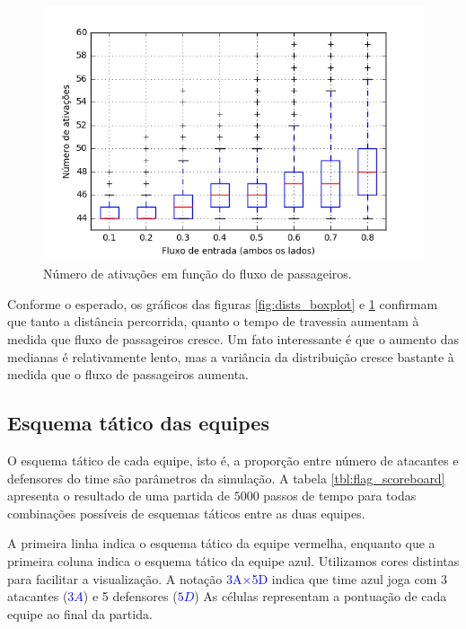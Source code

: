 \documentclass[preprint,12pt]{elsarticle}
\newcommand{\blu}[1]{\textcolor{blue}{#1}}
\begin{document}
\begin{figure}[H]
	\centering
	\includegraphics[totalheight=7cm]{figures/ativs_boxplot.png}
	\caption{Número de ativações em função do fluxo de passageiros.}
	\label{fig:atvs_boxplot}
\end{figure}

Conforme o esperado, os gráficos das figuras \ref{fig:dists_boxplot} e \ref{fig:atvs_boxplot} confirmam que tanto a distância percorrida, quanto o tempo de travessia aumentam à medida que fluxo de passageiros cresce. Um fato interessante é que o aumento das medianas é relativamente lento, mas a variância da distribuição cresce bastante à medida que o fluxo de passageiros aumenta.

\subsection{Esquema tático das equipes}
\label{subsec:esquema_tatico}

O esquema tático de cada equipe, isto é, a proporção entre número de atacantes e defensores do time são parâmetros da simulação. A tabela \ref{tbl:flag_scoreboard} apresenta o resultado de uma partida de $5000$ passos de tempo para todas combinações possíveis de esquemas táticos entre as duas equipes.

A primeira linha indica o esquema tático da equipe vermelha, enquanto que a primeira coluna indica o esquema tático da equipe azul. Utilizamos cores distintas para facilitar a visualização. A notação \blu{3A$\times$5D} indica que time azul joga com 3 atacantes (\blu{$3A$}) e 5 defensores (\blu{$5D$}) As células representam a pontuação de cada equipe ao final da partida. 
\end{document}
